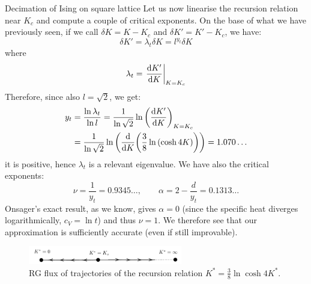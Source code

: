 \documentclass[../main/main.tex]{subfiles}
\begin{document}
\begin{example}{Decimation of Ising on square lattice}{}
Let us now linearise the recursion relation near \( K_c \) and compute a couple of critical exponents.
On the base of what we have previously seen, if we call \( \delta K = K - K_c \) and \( \delta K' = K' - K_c \), we have:
\begin{equation*}
  \delta K' = \lambda _t \delta K = l^{y _t} \delta K
\end{equation*}
where
\begin{equation*}
  \lambda _t = \eval{\dv{K'}{K} }_{K=K_c}
\end{equation*}
Therefore, since also \( l = \sqrt{2}  \), we get:
\begin{equation*}
\begin{split}
y_t  &= \frac{\ln{\lambda _t} }{\ln{l} } = \frac{1}{\ln{\sqrt{2} } } \ln{\qty(\dv{K'}{K})_{K=K_c} }   \\
& = \frac{1}{\ln{\sqrt{2} } }  \ln{\qty(\dv{}{K} \qty(\frac{3}{8} \ln{(\cosh 4K)} ) ) } = 1.070\dots
\end{split}
\end{equation*}
it is positive, hence \( \lambda _t \)  is a relevant eigenvalue.
We have also the critical exponents:
\begin{equation*}
  \nu = \frac{1}{y_t} = 0.9345\dots, \qquad \alpha = 2 - \frac{d}{y_t} = 0.1313\dots
\end{equation*}
Onsager's exact result, as we know, gives \( \alpha =0 \) (since the specific heat diverges logarithmically, \( c_V = \ln t \)) and thus \( \nu =1 \). We therefore see that our approximation is sufficiently accurate (even if still improvable).

\end{example}



\begin{figure}[h!]
\centering
\includegraphics[width=0.6\textwidth]{../lessons/20_image/9.pdf}
\caption{\label{fig:20_8} RG flux of trajectories of the recursion relation \(   K^* = \frac{3}{8} \ln{\cosh 4 K^*} \). }
\end{figure}
\end{document}
